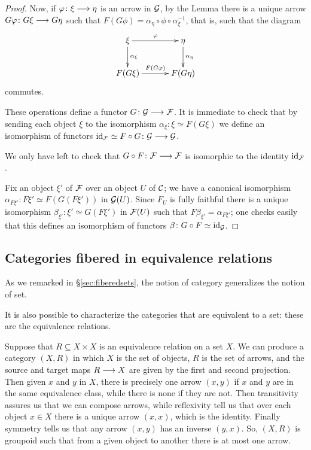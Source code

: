 \begin{3   FIBERED CATEGORIES}
\begin{3.5 Equivalences of fibered categories}
\begin{proof}
Now, if $\phi\colon \xi \arr \eta$ is an arrow in $\mathcal{G}$, by the Lemma there is a unique arrow $G \phi \colon G \xi \arr G \eta$ such that $F(G \phi) = \alpha_\eta\circ \phi \circ \alpha_\xi^{-1}$, that is, such that the diagram
   \[
   \xymatrix@C+8pt{{}\xi\ar[r]^{\phi}
    \ar[d]^{\alpha_\xi}& 
   {}\eta\ar[d]^{\alpha_\eta}\\
   F(G \xi)\ar[r]^{F(G \phi)}&F(G \eta)}
   \] commutes.

These operations define a functor $G \colon  \cG \arr \cF$. It is immediate to check that by sending each object $\xi$ to the isomorphism $\alpha_\xi \colon \xi \simeq F(G \xi)$ we define an isomorphism of functors $\id_{\mathcal F} \simeq F \circ G \colon \cG \arr \cG$. 

We only have left to check that $G \circ F \colon \cF \arr \cF$ is isomorphic to the identity $\mathrm{id}_{\mathcal F}$. 

Fix an object $\xi'$ of $\mathcal{F}$ over an object $U$ of $\mathcal{C}$; we have a canonical isomorphism $\alpha_{F \xi'} \colon F \xi' \simeq F(G(F \xi'))$ in $\mathcal{G}(U)$. Since $F_U$ is fully faithful there is a unique isomorphism $\beta_{\xi'} \colon \xi' \simeq G(F \xi')$ in $\mathcal{F}(U)$ such that $F \beta_{\xi'} = \alpha_{F \xi'}$; one checks easily that this defines an isomorphism of functors $\beta\colon G \circ F \simeq \mathrm{id}_{\mathcal G}$.
\end{proof}


\subsection{Categories fibered in equivalence relations}\label{subsec:fibered-eq-relations}

As we remarked in \S\ref{sec:fiberedsets}, the notion of category generalizes the notion of set.

It is also possible to characterize the categories that are equivalent to a set: these are the equivalence relations.

Suppose that $R \subseteq X \times X$ is an equivalence relation on a set $X$. We can produce a category $(X,R)$ in which $X$ is the set of objects, $R$ is the set of arrows, and the source and target maps $R \arr X$ are given by the first and second projection. Then given $x$ and $y$ in $X$, there is precisely one arrow $(x,y)$ if $x$ and $y$ are in the same equivalence class, while there is none if they are not. Then transitivity assures us that we can compose arrows, while reflexivity tell us that over each object $x \in X$ there is a unique arrow $(x,x)$, which is the identity. Finally symmetry tells us that any arrow $(x,y)$ has an inverse $(y,x)$. So, $(X, R)$ is groupoid such that from a given object to another there is at most one arrow.


\end{3.5 Equivalences of fibered categories}
\end{3   FIBERED CATEGORIES}
